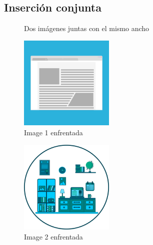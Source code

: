 \documentclass{article}
\begin{document}
\subsection{Inserción conjunta}
\begin{figure}[H] 
\centering
{}
\caption{Dos imágenes juntas con el mismo ancho} 
\end{figure}
\begin{multicols}{2} 
    \begin{figure}[H]
    \centering \includegraphics[width=0.4\textwidth]{Images/image1.png} \caption{Image 1 enfrentada}
    \end{figure} 
    \begin{figure}[H]
    \centering \includegraphics[width=0.4\textwidth]{Images/image2.png} \caption{Image 2 enfrentada}
    \end{figure} 
\end{multicols}
\end{document}
